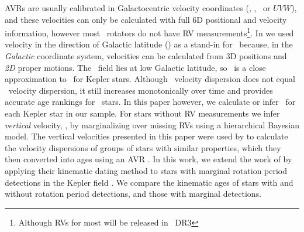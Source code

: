 
AVRs are usually calibrated in Galactocentric velocity coordinates (\vx, \vy,
\vz\ or $UVW$), and these velocities can only be calculated with full 6D
positional and velocity information, however most \kepler\ rotators do not
have RV measurements\footnote{Although RVs for most will be released in \gaia\
DR3}.
In \citep{angus2020} we used velocity in the direction of Galactic latitude
(\vb) as a stand-in for \vz\ because, in the {\it Galactic} coordinate system,
velocities can be calculated from 3D positions and {\it 2D} proper motions.
The \kepler\ field lies at low Galactic latitude, so \vb\ is a close
approximation to \vz\ for Kepler stars.
Although \vb\ velocity dispersion does not equal \vz\ velocity dispersion, it
still increases monotonically over time and provides accurate age rankings for
\kepler\ stars.
In this paper however, we calculate or infer \vz\ for each Kepler star in our
sample.
For stars without RV measurements we infer {\it vertical} velocity, \vz, by
marginalizing over missing RVs using a hierarchical Bayesian model.
The vertical velocities presented in this paper were used by \citet{lu2021} to
calculate the velocity dispersions of groups of stars with similar properties,
which they then converted into ages using an AVR \citep{yu2018}.
In this work, we extend the work of \citet{lu2021} by applying their kinematic
dating method to stars with marginal rotation period detections in the Kepler
field \citep{mcquillan2014}.
We compare the kinematic ages of stars with and without rotation period
detections, and those with marginal detections.

